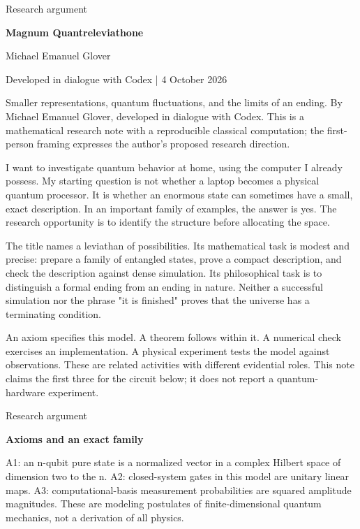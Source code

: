 \documentclass[10pt]{article}
\begin{document}
{\small\color{accent}Research argument}\par
{\LARGE\bfseries\color{ink}Magnum Quantreleviathone}\par\vspace{7pt}
Michael Emanuel Glover\par Developed in dialogue with Codex | 4 October 2026\par\vspace{8pt}
Smaller representations, quantum fluctuations, and the limits of an ending. By Michael Emanuel Glover, developed in dialogue with Codex. This is a mathematical research note with a reproducible classical computation; the first-person framing expresses the author's proposed research direction.\par
I want to investigate quantum behavior at home, using the computer I already possess. My starting question is not whether a laptop becomes a physical quantum processor. It is whether an enormous state can sometimes have a small, exact description. In an important family of examples, the answer is yes. The research opportunity is to identify the structure before allocating the space.\par
The title names a leviathan of possibilities. Its mathematical task is modest and precise: prepare a family of entangled states, prove a compact description, and check the description against dense simulation. Its philosophical task is to distinguish a formal ending from an ending in nature. Neither a successful simulation nor the phrase "it is finished" proves that the universe has a terminating condition.\par
An axiom specifies this model. A theorem follows within it. A numerical check exercises an implementation. A physical experiment tests the model against observations. These are related activities with different evidential roles. This note claims the first three for the circuit below; it does not report a quantum-hardware experiment.\par
\clearpage
{\small\color{accent}Research argument}\par
{\LARGE\bfseries\color{ink}Axioms and an exact family}\par\vspace{7pt}
A1: an n-qubit pure state is a normalized vector in a complex Hilbert space of dimension two to the n. A2: closed-system gates in this model are unitary linear maps. A3: computational-basis measurement probabilities are squared amplitude magnitudes. These are modeling postulates of finite-dimensional quantum mechanics, not a derivation of all physics.\par
\end{document}
